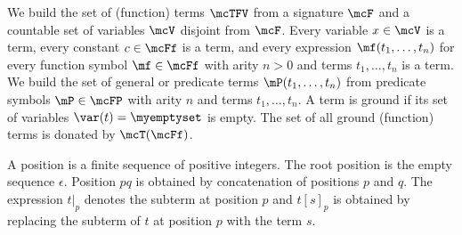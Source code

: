 \begin{definition}
We build the set of {\myem (function) terms} $\mcTFV$ 
from a signature $\mcF$ and 
a countable set of {\myem variables} $\mcV$ disjoint from $\mcF$.
Every variable $x\in\mcV$ is a term,
every constant $c\in\mcFf$ is a term, and
every expression $\mf(t_1,\ldots,t_n)$
for every function symbol $\mf\in\mcFf$ with arity $n>0$ 
and terms $t_1,\ldots,t_n$
is a term.
%
We build the set of general or {\myem predicate} terms $\mP(t_1,\ldots,t_n)$ from
predicate symbols $\mP\in\mcFP$ with arity $n$ and terms $t_1,\ldots,t_n$.
%
A term is {\myem ground} if its set of variables $\var(t)=\myemptyset$ is empty.
The set of all ground (function) terms is donated by $\mcT(\mcFf)$.
\end{definition}

%
\begin{definition}\label{def:position}
A {\myem position} is a finite sequence of positive integers.
The root position is the empty sequence $\epsilon$.
Position $pq$ is obtained by concatenation of positions $p$ and $q$.
%
The expression $t|_p$ denotes the subterm at position $p$
and $t[s]_p$ is obtained by replacing the subterm of $t$ at position $p$ with the term $s$.
%
\end{definition} 
